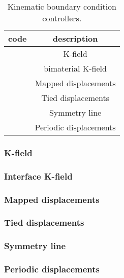 \begin{table}[h]
\caption{\label{tab.KBC.controller.type} Kinematic boundary condition controllers.}
\begin{center}
\begin{tabular}[c]{|c|c|}
\hline
 \parbox[b]{0.75in}{\centering \textbf{code}}
&\parbox[b]{2.0in}{\raggedright \textbf{description}}\\
\hline
\parbox[b]{0.75in}{} & 
\parbox[b]{2.0in}{\raggedright K-field}\\
\hline
\parbox[b]{0.75in}{}  & 
\parbox[b]{2.0in}{\raggedright bimaterial K-field}\\
\hline
\parbox[b]{0.75in}{}  & 
\parbox[b]{2.0in}{\raggedright Mapped displacements}\\
\hline
\parbox[b]{0.75in}{}  & 
\parbox[b]{2.0in}{\raggedright Tied displacements}\\
\hline
\parbox[b]{0.75in}{}  & 
\parbox[b]{2.0in}{\raggedright Symmetry line}\\
\hline
\parbox[b]{0.75in}{}  & 
\parbox[b]{2.0in}{\raggedright Periodic displacements}\\
\hline
\end{tabular}
\end{center}
\end{table}

\subsubsection{K-field}
\subsubsection{Interface K-field}
\subsubsection{Mapped displacements}
\subsubsection{Tied displacements}
\subsubsection{Symmetry line}
\subsubsection{Periodic displacements}


